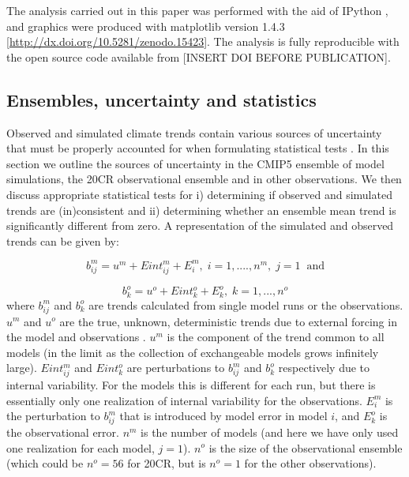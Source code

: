 \documentclass{ametsoc}
\begin{document}
The analysis carried out in this paper was performed with the aid of 
IPython \citep{Perez_and_Granger_2007}, and graphics were produced 
with matplotlib \citep{Hunter_2007} version 
1.4.3 [\url{http://dx.doi.org/10.5281/zenodo.15423}]. The analysis is
fully reproducible with the open source code 
available from [INSERT DOI BEFORE PUBLICATION].

\subsection*{Ensembles, uncertainty and statistics}
Observed and simulated climate trends contain various sources of uncertainty that
must be properly accounted for when formulating statistical tests \citep{Fyfe_et_al_2013, Santer_et_al_2008}. 
In this section we outline the sources of uncertainty in the CMIP5 ensemble of model simulations, 
the 20CR observational ensemble and in other observations. We then discuss appropriate statistical tests 
for i) determining if observed and simulated trends are (in)consistent and ii) determining whether
an ensemble mean trend is significantly different from zero. A representation of the simulated and 
observed trends can be given by:

\begin{equation} \label{eq:mods}
b^m_{ij} = u^m + Eint^m_{ij} + E^m_i, \; i=1,...., n^m,\; j=1 \;\; \textrm{and}
\end{equation}

\begin{equation}\label{eq:obs}
b^o_k = u^o + Eint_k^o + E^o_k, \; k=1,...,n^o
\end{equation}
where $b^m_{ij}$ and $b^o_k$ are trends calculated from single model runs or the observations. 
$u^m$ and $u^o$ are the true, unknown, deterministic trends due to external forcing 
in the model and observations \citep{Fyfe_et_al_2013}. 
$u^m$ is the component of the trend common to all models (in the limit as the collection of 
exchangeable models grows infinitely large). $Eint^m_{ij}$ and $Eint_k^o$ are perturbations 
to $b^m_{ij}$ and $b^o_k$ respectively due to 
internal variability. For the models this is different for each run, but there is essentially only 
one realization of internal variability for the observations. $E^m_i$ is the 
perturbation to $b^m_{ij}$ that is introduced by model error in model $i$, and $E^o_k$ 
is the observational error. $n^m$ is the number of models (and here we have only 
used one realization for each model, $j=1$). $n^o$ is the size of the observational ensemble
(which could be $n^o=56$ for 20CR, but is $n^o=1$ for the other observations). 
\end{document}
